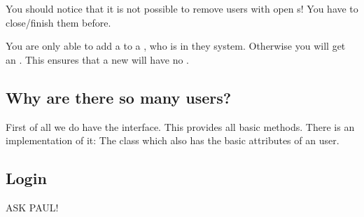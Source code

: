 You should notice that it is not possible to remove users with open s! You have to close/finish them before.

You are only able to add a  to a , who is in they system. Otherwise you will get an .
This ensures that a new  will have no .

\subsection{Why are there so many users?}
First of all we do have the  interface. This provides all basic methods. There is an implementation of it: The
 class which also has the basic attributes of an user.

\subsection{Login}

ASK PAUL!





